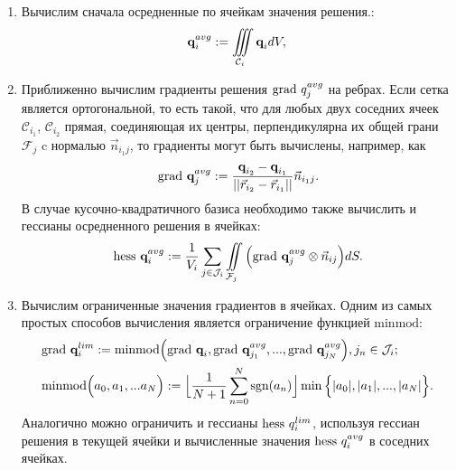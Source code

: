 \documentclass[14pt, a4paper, fleqn]{extreport}
\begin{document}
	\begin{enumerate}
	
	\item 
	Вычислим сначала осредненные по ячейкам значения решения.:
	\begin{equation*}
		\textbf{q}_i^{avg} := \iiint\limits_{\mathcal{C}_i} \textbf{q}_i dV, \\
	\end{equation*}
	
	\item 
	Приближенно вычислим градиенты решения $\text{grad }{q}_j^{avg}$ на ребрах.
	Если сетка является ортогональной, то есть такой, что для любых двух соседних
	ячеек $\mathcal{C}_{i_1}$, $\mathcal{C}_{i_2}$ прямая, соединяющая их центры, 
	перпендикулярна их общей грани $\mathcal{F}_j$ c нормалью $\vec{n}_{i_1 j}$, 
	то градиенты могут быть вычислены, например, как
	\begin{equation*}
		\text{grad }{\textbf{q}}_j^{avg} 
			:= \dfrac{\textbf{q}_{i_2} - \textbf{q}_{i_1}}{||\vec{r}_{i_2} - \vec{r}_{i_1}||}\vec{n}_{i_1 j}.
	\end{equation*}
 	В случае кусочно-квадратичного базиса необходимо также вычислить и 
 	гессианы осредненного решения в ячейках:
	\begin{equation*}
		\text{hess }{\textbf{q}}_i^{avg} 
			:= \dfrac{1}{V_i} \sum\limits_{j \in \mathcal{J}_i}\iint\limits_{\mathcal{F}_j} 
				\Big( \text{grad }{\textbf{q}}_j^{avg} \otimes \vec{n}_{ij} \Big) dS.
	\end{equation*}
	
	\item
	Вычислим ограниченные значения градиентов в ячейках.
	Одним из самых простых способов вычисления является ограничение функцией $\text{minmod}$:
	\begin{equation*}
	\begin{split}
		&\text{grad }{\textbf{q}}_i^{lim} 
			:= \text{minmod}\Big( \text{grad }{\textbf{q}_i}, \text{grad }{\textbf{q}}_{j_1}^{avg}, ..., \text{grad }{\textbf{q}}_{j_N}^{avg} \Big), 
				j_n \in \mathcal{J}_i; \\
		&\text{minmod}\Big(a_0,a_1,...a_N\Big) 
			:= \Big\lfloor \dfrac{1}{N+1}\sum\limits_{n=0}^N \text{sgn}(a_n) \Big\rfloor
				\min\Big\lbrace |a_0|,|a_1|,...,|a_N| \Big\rbrace.
	\end{split}
	\end{equation*}
	Аналогично можно ограничить и гессианы $\text{hess }{q}_i^{lim}$, используя гессиан решения в текущей ячейки
	и вычисленные значения $\text{hess }{q}_i^{avg}$ в соседних ячейках.
		

\end{enumerate}
\end{document}
